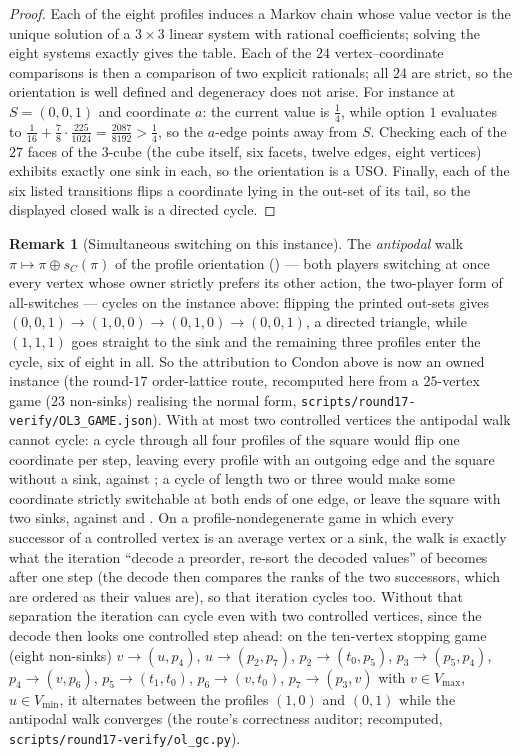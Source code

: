 \documentclass[11pt]{article}
\theoremstyle{plain}
\theoremstyle{definition}
\newtheorem{remark}[theorem]{Remark}
\newcommand{\Vmax}{V_{\max}}
\newcommand{\Vmin}{V_{\min}}
\begin{document}
\begin{proof}
Each of the eight profiles induces a Markov chain whose value vector is
the unique solution of a $3\times3$ linear system with rational
coefficients; solving the eight systems exactly gives the table. Each of
the $24$ vertex--coordinate comparisons is then a comparison of two
explicit rationals; all $24$ are strict, so the orientation is
well defined and degeneracy does not arise. For instance at $S=(0,0,1)$
and coordinate $a$: the current value is $\tfrac14$, while option $1$
evaluates to $\tfrac1{16}+\tfrac78\cdot\tfrac{225}{1024}=\tfrac{2087}{8192}>\tfrac14$,
so the $a$-edge points away from $S$. Checking each of the $27$ faces of
the $3$-cube (the cube itself, six facets, twelve edges, eight vertices)
exhibits exactly one sink in each, so the orientation is a USO. Finally,
each of the six listed transitions flips a coordinate lying in the
out-set of its tail, so the displayed closed walk is a directed cycle.
\end{proof}

\begin{remark}[Simultaneous switching on this instance]\label{rem:cyclic-antipodal}
The \emph{antipodal} walk $\pi\mapsto\pi\oplus s_C(\pi)$ of the profile
orientation () --- both players switching at
once every vertex whose owner strictly prefers its other action, the
two-player form of all-switches --- cycles on the instance above: flipping
the printed out-sets gives $(0,0,1)\to(1,0,0)\to(0,1,0)\to(0,0,1)$, a
directed triangle, while $(1,1,1)$ goes straight to the sink and the
remaining three profiles enter the cycle, six of eight in all. So
the attribution to Condon above is now an owned instance (the round-$17$
order-lattice route, recomputed here from a $25$-vertex game ($23$ non-sinks) realising the
normal form, \texttt{scripts/round17-verify/OL3\_GAME.json}). With at most
two controlled vertices the antipodal walk cannot cycle: a cycle through
all four profiles of the square would flip one coordinate per step, leaving
every profile with an outgoing edge and the square without a sink, against
; a cycle of length two or three would make some
coordinate strictly switchable at both ends of one edge, or leave the
square with two sinks, against  and
. On a profile-nondegenerate game in which every
successor of a controlled vertex is an average vertex or a sink, the walk
is exactly what the iteration ``decode a preorder, re-sort the decoded
values'' of  becomes after one step (the decode
then compares the ranks of the two successors, which are ordered as their
values are), so that iteration cycles too. Without that separation the
iteration can cycle even with two controlled vertices, since the decode
then looks one controlled step ahead: on the ten-vertex stopping game (eight non-sinks)
$v\to(u,p_4)$, $u\to(p_2,p_7)$, $p_2\to(t_0,p_5)$, $p_3\to(p_5,p_4)$,
$p_4\to(v,p_6)$, $p_5\to(t_1,t_0)$, $p_6\to(v,t_0)$, $p_7\to(p_3,v)$ with
$v\in\Vmax$, $u\in\Vmin$, it alternates between the profiles $(1,0)$ and
$(0,1)$ while the antipodal walk converges (the route's correctness
auditor; recomputed, \texttt{scripts/round17-verify/ol\_gc.py}).
\end{remark}
\end{document}
